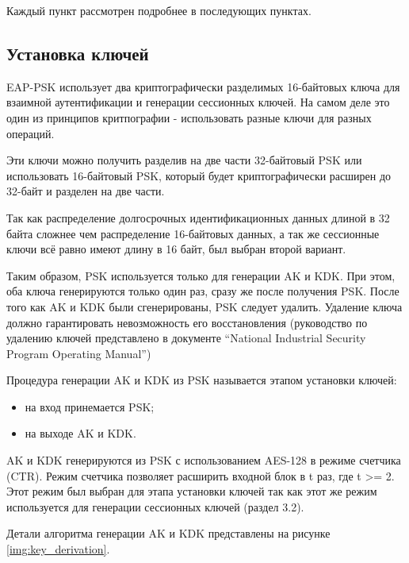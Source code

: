 Каждый пункт рассмотрен подробнее в последующих пунктах.

\subsection{Установка ключей}

EAP-PSK использует два криптографически разделимых 16-байтовых ключа для взаимной аутентификации и генерации сессионных ключей. На самом деле это один из принципов критпографии - использовать разные ключи для разных операций.

Эти ключи можно получить разделив на две части 32-байтовый PSK или использовать 16-байтовый PSK, который будет криптографически расширен до 32-байт и разделен на две части.

Так как распределение долгосрочных идентификационных данных длиной в 32 байта сложнее чем распределение 16-байтовых данных, а так же сессионные ключи всё равно имеют длину в 16 байт, был выбран второй вариант.

Таким образом, PSK используется только для генерации AK и KDK. При этом, оба ключа генерируются только один раз, сразу же после получения PSK. После того как AK и KDK были сгенерированы, PSK следует удалить. Удаление ключа должно гарантировать невозможность его восстановления (руководство по удалению ключей представлено в документе ``National Industrial Security Program Operating Manual'')

Процедура генерации AK и KDK из PSK называется этапом установки ключей:

\begin{itemize}
\item на вход принемается PSK;
\item на выходе AK и KDK.
\end{itemize}

AK и KDK генерируются из PSK с использованием AES-128 в режиме счетчика (CTR). Режим счетчика позволяет расширить входной блок в t раз, где t >= 2. Этот режим был выбран для этапа установки ключей так как этот же режим используется для генерации сессионных ключей (раздел 3.2).

Детали алгоритма генерации AK и KDK представлены на рисунке \ref{img:key_derivation}.

